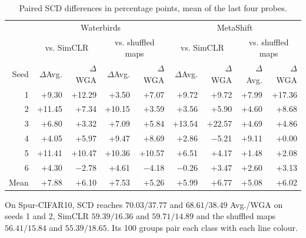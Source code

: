 \documentclass{article}
\begin{document}
\begin{table}[htbp]
\centering\small
\caption{Paired SCD differences in percentage points, mean of the last four probes.}
\begin{tabular}{rrrrrrrrr}
\toprule
& \multicolumn{4}{c}{Waterbirds} & \multicolumn{4}{c}{MetaShift} \\
& \multicolumn{2}{c}{vs. SimCLR} & \multicolumn{2}{c}{vs. shuffled maps} & \multicolumn{2}{c}{vs. SimCLR} & \multicolumn{2}{c}{vs. shuffled maps} \\
Seed & $\Delta$Avg. & $\Delta$WGA & $\Delta$Avg. & $\Delta$WGA & $\Delta$Avg. & $\Delta$WGA & $\Delta$Avg. & $\Delta$WGA \\
\midrule
1 & +9.30 & +12.29 & +3.50 & +7.07 & +9.72 & +9.72 & +7.99 & +17.36 \\
2 & +11.45 & +7.34 & +10.15 & +3.59 & +3.56 & +5.90 & +4.60 & +8.68 \\
3 & +6.80 & +3.32 & +7.09 & +5.84 & +13.54 & +22.57 & +4.69 & +4.86 \\
4 & +4.05 & +5.97 & +9.47 & +8.69 & +2.86 & $-$5.21 & +9.11 & +0.00 \\
5 & +11.41 & +10.47 & +10.36 & +10.57 & +6.51 & +4.17 & +1.48 & +2.08 \\
6 & +4.30 & $-$2.78 & +4.61 & $-$4.18 & $-$0.26 & +3.47 & +2.60 & +3.13 \\
\midrule
Mean & +7.88 & +6.10 & +7.53 & +5.26 & +5.99 & +6.77 & +5.08 & +6.02 \\
\bottomrule
\end{tabular}
\end{table}

On Spur-CIFAR10, SCD reaches $70.03/37.77$ and $68.61/38.49$ Avg./WGA on seeds 1 and 2, SimCLR $59.39/16.36$ and $59.71/14.89$ and the shuffled maps $56.41/15.84$ and $55.39/18.65$. Its 100 groups pair each class with each line colour.
\end{document}
